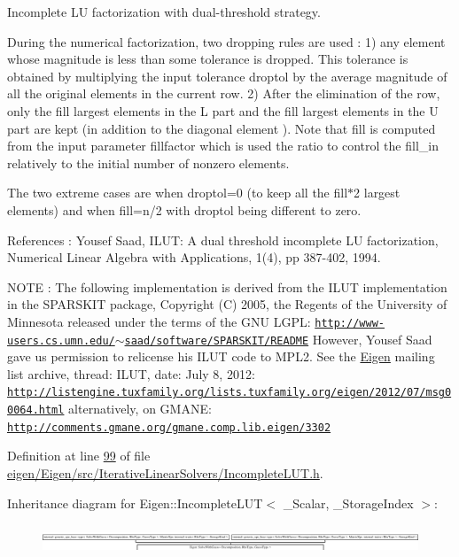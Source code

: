 Incomplete LU factorization with dual-\/threshold strategy. 

During the numerical factorization, two dropping rules are used \+: 1) any element whose magnitude is less than some tolerance is dropped. This tolerance is obtained by multiplying the input tolerance {\ttfamily droptol} by the average magnitude of all the original elements in the current row. 2) After the elimination of the row, only the {\ttfamily fill} largest elements in the L part and the {\ttfamily fill} largest elements in the U part are kept (in addition to the diagonal element ). Note that {\ttfamily fill} is computed from the input parameter {\ttfamily fillfactor} which is used the ratio to control the fill\+\_\+in relatively to the initial number of nonzero elements.

The two extreme cases are when {\ttfamily droptol=0} (to keep all the {\ttfamily fill$\ast$2} largest elements) and when {\ttfamily fill=n/2} with {\ttfamily droptol} being different to zero.

References \+: Yousef Saad, I\+L\+UT\+: A dual threshold incomplete LU factorization, Numerical Linear Algebra with Applications, 1(4), pp 387-\/402, 1994.

N\+O\+TE \+: The following implementation is derived from the I\+L\+UT implementation in the S\+P\+A\+R\+S\+K\+IT package, Copyright (C) 2005, the Regents of the University of Minnesota released under the terms of the G\+NU L\+G\+PL\+: \href{http://www-users.cs.umn.edu/~saad/software/SPARSKIT/README}{\tt http\+://www-\/users.\+cs.\+umn.\+edu/$\sim$saad/software/\+S\+P\+A\+R\+S\+K\+I\+T/\+R\+E\+A\+D\+ME} However, Yousef Saad gave us permission to relicense his I\+L\+UT code to M\+P\+L2. See the \hyperlink{namespace_eigen}{Eigen} mailing list archive, thread\+: I\+L\+UT, date\+: July 8, 2012\+: \href{http://listengine.tuxfamily.org/lists.tuxfamily.org/eigen/2012/07/msg00064.html}{\tt http\+://listengine.\+tuxfamily.\+org/lists.\+tuxfamily.\+org/eigen/2012/07/msg00064.\+html} alternatively, on G\+M\+A\+NE\+: \href{http://comments.gmane.org/gmane.comp.lib.eigen/3302}{\tt http\+://comments.\+gmane.\+org/gmane.\+comp.\+lib.\+eigen/3302} 

Definition at line \hyperlink{eigen_2_eigen_2src_2_iterative_linear_solvers_2_incomplete_l_u_t_8h_source_l00099}{99} of file \hyperlink{eigen_2_eigen_2src_2_iterative_linear_solvers_2_incomplete_l_u_t_8h_source}{eigen/\+Eigen/src/\+Iterative\+Linear\+Solvers/\+Incomplete\+L\+U\+T.\+h}.

Inheritance diagram for Eigen\+:\+:Incomplete\+L\+UT$<$ \+\_\+\+Scalar, \+\_\+\+Storage\+Index $>$\+:\begin{figure}[H]
\begin{center}
\leavevmode
\includegraphics[height=0.983607cm]{group___iterative_linear_solvers___module}
\end{center}
\end{figure}
